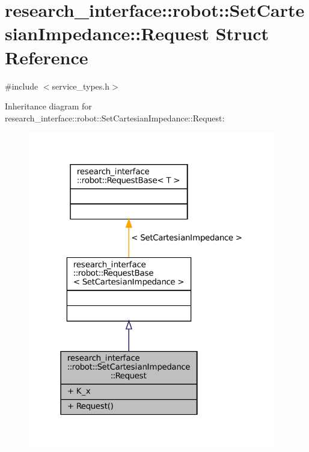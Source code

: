 \hypertarget{structresearch__interface_1_1robot_1_1SetCartesianImpedance_1_1Request}{}\section{research\+\_\+interface\+:\+:robot\+:\+:Set\+Cartesian\+Impedance\+:\+:Request Struct Reference}
\label{structresearch__interface_1_1robot_1_1SetCartesianImpedance_1_1Request}


{\ttfamily \#include $<$service\+\_\+types.\+h$>$}



Inheritance diagram for research\+\_\+interface\+:\+:robot\+:\+:Set\+Cartesian\+Impedance\+:\+:Request\+:
\nopagebreak
\begin{figure}[H]
\begin{center}
\leavevmode
\includegraphics[width=307pt]{structresearch__interface_1_1robot_1_1SetCartesianImpedance_1_1Request__inherit__graph}
\end{center}
\end{figure}


